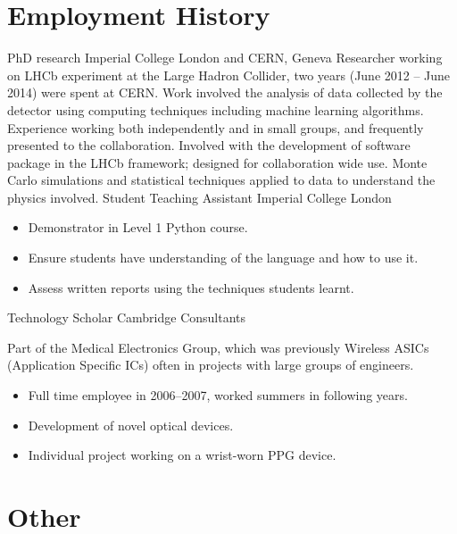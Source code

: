 \section{Employment History}
{PhD research}
{Imperial College London and CERN, Geneva}
{}{}
{
  Researcher working on LHCb experiment at the Large Hadron Collider, two years (June 2012 -- June
  2014) were spent at CERN.
  Work involved the analysis of data collected by the detector using computing techniques including
  machine learning algorithms.
  Experience working both independently and in small groups, and frequently presented to the
  collaboration.
  Involved with the development of software package in the LHCb framework; designed for
  collaboration wide use.
  Monte Carlo simulations and statistical techniques applied to data to understand the physics
  involved.
}
{Student Teaching Assistant}
{Imperial College London}
{}{}
{
  \begin{itemize}
    \item Demonstrator in Level 1 Python course.
    \item Ensure students have understanding of the language and how to use it.
    \item Assess written reports using the techniques students learnt.
  \end{itemize}
}
{Technology Scholar}
{Cambridge Consultants}
{}{}
{
  Part of the Medical Electronics Group, which was previously Wireless ASICs (Application
  Specific ICs) often in projects with large groups of engineers.
  \begin{itemize}
    \item Full time employee in 2006--2007, worked summers in following years.
    \item Development of novel optical devices.
    \item Individual project working on a wrist-worn PPG device.
  \end{itemize}
}


\section{Other}

